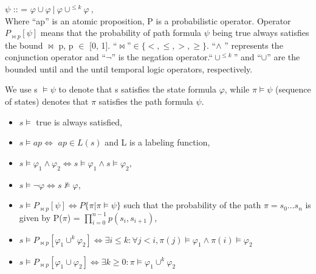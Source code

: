 \documentclass[3p,times,procedia,authoryear,round]{elsarticle}
\begin{document}
$\psi$ :: =  $\varphi \cup \varphi \ | \ \varphi \cup ^{\leq k}\varphi  \ , $ \\

Where ``ap'' is an atomic proposition, P is a probabilistic operator. Operator $P _{ \bowtie p } [ \psi ] $  means that the probability of path formula $\psi$ being true always satisfies the bound $\Join $ p, p $\in $ [0, 1]. ``$\Join $''$\in \{ <,\leq,>,\geq \}$. ``$\wedge$ '' represents the conjunction operator and ``$\neg$'' is the negation operator.``$\cup^{\leq k}$'' and ``$\cup$'' are  the bounded until and the until temporal logic operators, respectively.

We use s $\vDash \psi$ to denote that s satisfies the state formula $\varphi$, while $\pi \vDash \psi $ (sequence of states) denotes that $\pi$ satisfies the path formula $\psi$.

\begin{itemize}
	\item $s \vDash$ true is always satisfied,
	\item $s \vDash ap \Longleftrightarrow$  $ap \in L(s)$ and L is a labeling function,
	\item $s \vDash \varphi_{1} \wedge \varphi_{2} \Longleftrightarrow s \vDash \varphi_{1} \wedge s \vDash \varphi_{2}$,
	\item $s \vDash \neg \varphi \Longleftrightarrow s \nvDash \varphi $,
    

	\item $s \vDash P _{ \bowtie p } [ \psi ] \Longleftrightarrow P\{ \pi | \pi\vDash \psi  \}$ such that the probability of the path $\pi =s_{0}...s_{n}$ is given by P($\pi$) = $\prod^{n-1}_{i=0} p(s_{i}, s_{i+1})$,

	\item $s \vDash P _{ \bowtie p } [ \varphi_{1} \cup^{k} \varphi_{2}  ] \Longleftrightarrow \exists i \leq k : \forall j < i, \pi(j)\vDash \varphi_{1} \wedge  \pi(i)\vDash \varphi_{2}$
 
	\item $s \vDash P _{ \bowtie p } [ \varphi_{1} \cup \varphi_{2}  ] \Longleftrightarrow \exists k \geq 0 : \pi \vDash \varphi_{1} \cup^{k} \varphi_{2} $
    \end{itemize}
\end{document}
